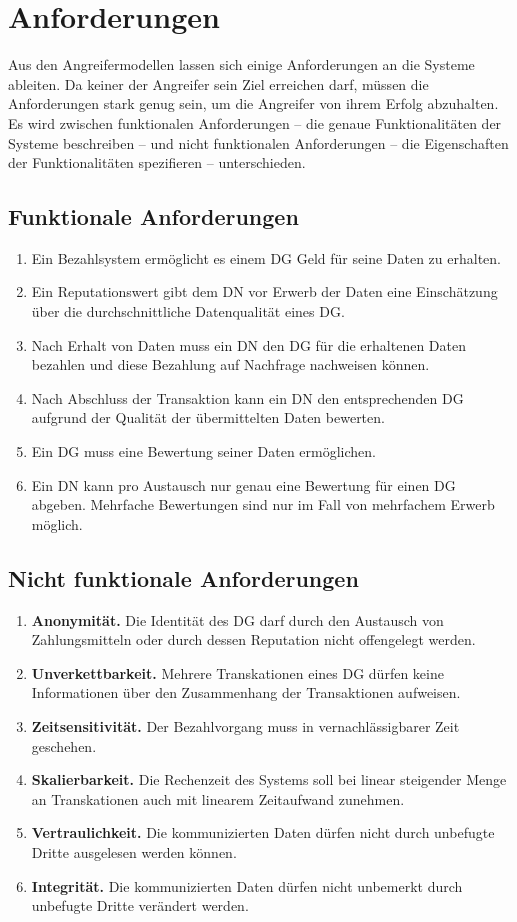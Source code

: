 \documentclass[
	fontsize=11pt,
	headings=small,
	parskip=half,           %
	bibliography=totoc,
	numbers=noenddot,       %
	open=any,               %
]{scrreprt}
\begin{document}
\section{Anforderungen}
Aus den Angreifermodellen lassen sich einige Anforderungen an die Systeme ableiten. Da keiner der Angreifer sein Ziel erreichen darf, müssen die Anforderungen stark genug sein, um die Angreifer von ihrem Erfolg abzuhalten. Es wird zwischen funktionalen Anforderungen -- die genaue Funktionalitäten der Systeme beschreiben -- und nicht funktionalen Anforderungen -- die Eigenschaften der Funktionalitäten spezifieren -- unterschieden.
\subsection{Funktionale Anforderungen}
\label{enum:req:funktional}
\begin{enumerate}
    \item Ein Bezahlsystem ermöglicht es einem DG Geld für seine Daten zu erhalten.
    \item Ein Reputationswert gibt dem DN vor Erwerb der Daten eine Einschätzung über die durchschnittliche Datenqualität eines DG.
    \item Nach Erhalt von Daten muss ein DN den DG für die erhaltenen Daten bezahlen und diese Bezahlung auf Nachfrage nachweisen können.
    \item Nach Abschluss der Transaktion kann ein DN den entsprechenden DG aufgrund der Qualität der übermittelten Daten bewerten.
    \item Ein DG muss eine Bewertung seiner Daten ermöglichen.
    \item Ein DN kann pro Austausch nur genau eine Bewertung für einen DG abgeben. Mehrfache Bewertungen sind nur im Fall von mehrfachem Erwerb möglich.
\end{enumerate}

\subsection{Nicht funktionale Anforderungen}
\label{enum:req:nichtfunktional}
\begin{enumerate}
    \item \textbf{Anonymität.} Die Identität des DG darf durch den Austausch von Zahlungsmitteln oder durch dessen Reputation nicht offengelegt werden.
    \item \textbf{Unverkettbarkeit.} Mehrere Transkationen eines DG dürfen keine Informationen über den Zusammenhang der Transaktionen aufweisen. 
    \item \textbf{Zeitsensitivität.} Der Bezahlvorgang muss in vernachlässigbarer Zeit geschehen.
    \item \textbf{Skalierbarkeit.} Die Rechenzeit des Systems soll bei linear steigender Menge an Transkationen auch mit linearem Zeitaufwand zunehmen.
    \item \textbf{Vertraulichkeit.} Die kommunizierten Daten dürfen nicht durch unbefugte Dritte ausgelesen werden können.
    \item \textbf{Integrität.} Die kommunizierten Daten dürfen nicht unbemerkt durch unbefugte Dritte verändert werden.
\end{enumerate}
\end{document}
